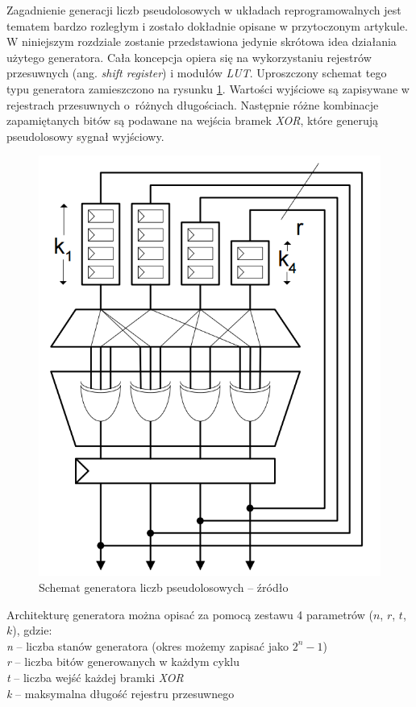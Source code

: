 Zagadnienie generacji liczb pseudolosowych w układach reprogramowalnych jest tematem bardzo rozległym i zostało dokładnie opisane w przytoczonym artykule. 
W niniejszym rozdziale zostanie przedstawiona jedynie skrótowa idea działania użytego generatora. 
Cała koncepcja opiera się na wykorzystaniu rejestrów przesuwnych (ang. \textit{shift register}) i modułów \textit{LUT}. %
Uproszczony schemat tego typu generatora zamieszczono na rysunku \ref{fig:fpga_rng}. 
Wartości wyjściowe są zapisywane w rejestrach przesuwnych o~różnych długościach. 
Następnie różne kombinacje zapamiętanych bitów są podawane na wejścia bramek \textit{XOR}, które generują pseudolosowy sygnał wyjściowy.

	\begin{figure}[h!]
        \centering
		\includegraphics[scale=0.3]{img/4/rng_scheme.png}
		\caption{Schemat generatora liczb pseudolosowych -- źródło \cite{thomas_10}}
		\label{fig:fpga_rng}
	\end{figure}

Architekturę generatora można opisać za pomocą zestawu 4 parametrów ($n$, $r$, $t$, $k$), gdzie:\\
\-\hspace{1cm} \textit{n} -- liczba stanów generatora (okres możemy zapisać jako $2^n-1$)\\
\-\hspace{1cm} \textit{r} -- liczba bitów generowanych w każdym cyklu\\
\-\hspace{1cm} \textit{t} -- liczba wejść każdej bramki \textit{XOR}\\
\-\hspace{1cm} \textit{k} -- maksymalna długość rejestru przesuwnego\\

